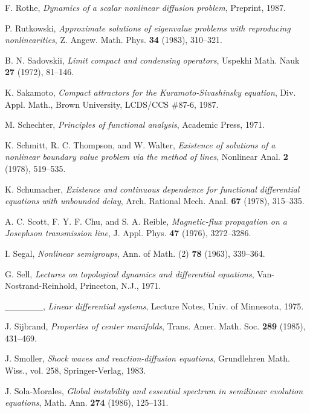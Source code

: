 \documentclass{surv-l}
\theoremstyle{plain}
\theoremstyle{definition}
\numberwithin{equation}{section}
\numberwithin{figure}{chapter}
\begin{document}
\begin{thebibliography}{}
F. Rothe, \emph{Dynamics of a scalar nonlinear diffusion problem}, Preprint, 1987.

P. Rutkowski, \emph{Approximate solutions of eigenvalue problems with reproducing nonlinearities}, Z. Angew. Math. Phys. \textbf{34} (1983), 310--321.

B. N. Sadovski\u{i}, \emph{Limit compact and condensing operators}, Uspekhi Math. Nauk \textbf{27} (1972), 81--146.

K. Sakamoto, \emph{Compact attractors for the Kuramoto-Sivashinsky equation}, Div. Appl. Math., Brown University, LCDS/CCS {\#}87-6, 1987.

M. Schechter, \emph{Principles of functional analysis}, Academic Press, 1971.

K. Schmitt, R. C. Thompson, and W. Walter, \emph{Existence of solutions of a nonlinear boundary value problem via the method of lines}, Nonlinear Anal. \textbf{2} (1978), 519--535.

K. Schumacher, \emph{Existence and continuous dependence for functional differential equations with unbounded delay}, Arch. Rational Mech. Anal. \textbf{67} (1978), 315--335.

A. C. Scott, F. Y. F. Chu, and S. A. Reible, \emph{Magnetic-flux propagation on a Josephson transmission line}, J. Appl. Phys. \textbf{47} (1976), 3272--3286.

I. Segal, \emph{Nonlinear semigroups}, Ann. of Math. (2) \textbf{78} (1963), 339--364.

G. Sell, \emph{Lectures on topological dynamics and differential equations}, Van-Nostrand-Reinhold, Princeton, N.J., 1971.

 \_\_\_\_\_\_, \emph{Linear differential systems}, Lecture Notes, Univ. of Minnesota, 1975.

J. Sijbrand, \emph{Properties of center manifolds}, Trans. Amer. Math. Soc. \textbf{289}
(1985), 431--469.

J. Smoller, \emph{Shock waves and reaction-diffusion equations}, Grundlehren Math. Wiss., vol. 258, Springer-Verlag, 1983.

J. Sola-Morales, \emph{Global instability and essential spectrum in semilinear evolution equations}, Math. Ann. \textbf{274} (1986), 125--131.


\end{thebibliography}
\end{document}
